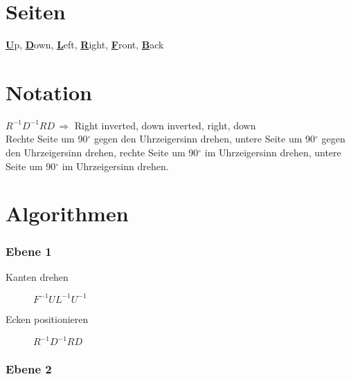 \documentclass[a4paper,oneside,11pt]{scrartcl}
\title{\titel}
\author{\autor}
\date{\datum}
\newcommand{\grad}{$^\circ$}
\begin{document}
\maketitle

\section*{Seiten} %
\label{sec:seiten}

\textbf{\underline{U}}p,
\textbf{\underline{D}}own,
\textbf{\underline{L}}eft,
\textbf{\underline{R}}ight,
\textbf{\underline{F}}ront,
\textbf{\underline{B}}ack


\section*{Notation} %
\label{sec:notation}

$R^{-1}D^{-1}RD \,\Rightarrow$ \glqq Right inverted, down inverted, right, down\grqq \\\glqq Rechte Seite um 90\grad{} gegen den Uhrzeigersinn drehen, untere Seite um 90\grad{} gegen den Uhrzeigersinn drehen, rechte Seite um 90\grad{} im Uhrzeigersinn drehen, untere Seite um 90\grad{} im Uhrzeigersinn drehen.\grqq


\section*{Algorithmen} %
\label{sec:algorithmen}

\subsubsection*{Ebene 1} %
\label{ssub:ebene_1}

\begin{description}
	\item[Kanten drehen] $F^{-1}UL^{-1}U^{-1}$
	\item[Ecken positionieren] $R^{-1}D^{-1}RD$
\end{description}


\subsubsection*{Ebene 2} %
\label{ssub:ebene_2}
\end{document}
